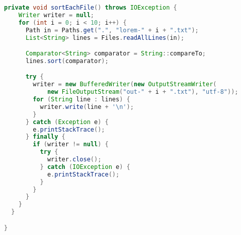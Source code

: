\begin{lstlisting}[language=Java]
  private void sortEachFile() throws IOException {
    Writer writer = null;
    for (int i = 0; i < 10; i++) {
      Path in = Paths.get(".", "lorem-" + i + ".txt");
      List<String> lines = Files.readAllLines(in);

      Comparator<String> comparator = String::compareTo;
      lines.sort(comparator);

      try {
        writer = new BufferedWriter(new OutputStreamWriter(
            new FileOutputStream("out-" + i + ".txt"), "utf-8"));
        for (String line : lines) {
          writer.write(line + '\n');
        }
      } catch (Exception e) {
        e.printStackTrace();
      } finally {
        if (writer != null) {
          try {
            writer.close();
          } catch (IOException e) {
            e.printStackTrace();
          }
        }
      }
    }
  }

}

\end{lstlisting}